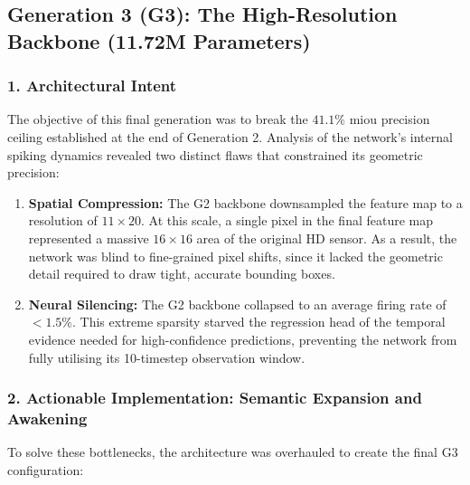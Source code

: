 
\subsection{Generation 3 (G3): The High-Resolution Backbone (11.72M Parameters)}

\subsubsection*{1. Architectural Intent}
The objective of this final generation was to break the $41.1\%$ \gls{miou} precision ceiling established at the end of Generation 2.
Analysis of the network's internal spiking dynamics revealed two distinct flaws that constrained its geometric precision:

\begin{enumerate}
    \item \textbf{Spatial Compression:}
    The G2 backbone downsampled the feature map to a resolution of $11 \times 20$.
    At this scale, a single pixel in the final feature map represented a massive $16 \times 16$ area of the original HD sensor.
    As a result, the network was blind to fine-grained pixel shifts, since it lacked the geometric detail required to draw tight, accurate bounding boxes.

    \item \textbf{Neural Silencing:}
    The G2 backbone collapsed to an average firing rate of $< 1.5\%$.
    This extreme sparsity starved the regression head of the temporal evidence needed for high-confidence predictions, preventing the network from fully utilising its 10-timestep observation window.
\end{enumerate}

\subsubsection*{2. Actionable Implementation: Semantic Expansion and Awakening}
To solve these bottlenecks, the architecture was overhauled to create the final G3 configuration:

